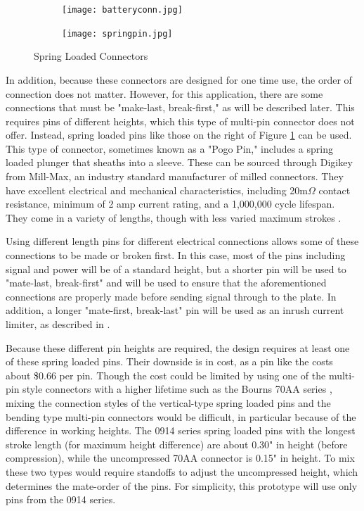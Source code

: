 \documentclass{article}
\begin{document}
		\begin{figure}
			\begin{subfigure}{0.4\textwidth}
				\centering
				\texttt{[image: batteryconn.jpg]}
			\end{subfigure}
			\begin{subfigure}{0.4\textwidth}
				\centering
				\texttt{[image: springpin.jpg]}
			\end{subfigure}
			\label{fig:springloaded}
			\caption{Spring Loaded Connectors}
		\end{figure}

		In addition, because these connectors are designed for one time use, the order of connection does not matter.  However, for this application, there are some connections that must be "make-last, break-first," as will be described later.  This requires pins of different heights, which this type of multi-pin connector does not offer.  Instead, spring loaded pins like those on the right of Figure \ref{fig:springloaded} can be used.  This type of connector, sometimes known as a "Pogo Pin," includes a spring loaded plunger that sheaths into a sleeve.  These can be sourced through Digikey from Mill-Max, an industry standard manufacturer of milled connectors.  They have excellent electrical and mechanical characteristics, including 20m$\Omega$ contact resistance, minimum of 2 amp current rating, and a 1,000,000 cycle lifespan.  They come in a variety of lengths, though with less varied maximum strokes \cite{MillMax_025}.

		Using different length pins for different electrical connections allows some of these connections to be made or broken first.  In this case, most of the pins including signal and power will be of a standard height, but a shorter pin will be used to "mate-last, break-first" and will be used to ensure that the aforementioned connections are properly made before sending signal through to the plate.  In addition, a longer "mate-first, break-last" pin will be used as an inrush current limiter, as described in \cite{DesignforHotSwap}.

		Because these different pin heights are required, the design requires at least one of these spring loaded pins.  Their downside is in cost, as a pin like the costs about \$0.66 per pin.  Though the cost could be limited by using one of the multi-pin style connectors with a higher lifetime such as the Bourns 70AA series \cite{Bourns70AA_datahseet}, mixing the connection styles of the vertical-type spring loaded pins and the bending type multi-pin connectors would be difficult, in particular because of the difference in working heights.  The 0914 series spring loaded pins with the longest stroke length (for maximum height difference) are about 0.30" in height (before compression), while the uncompressed 70AA connector is 0.15" in height.  To mix these two types would require standoffs to adjust the uncompressed height, which determines the mate-order of the pins.  For simplicity, this prototype will use only pins from the 0914 series.
\end{document}
